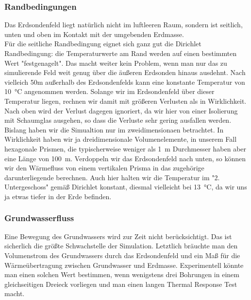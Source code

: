 \documentclass[12pt,a4paper]{article}
\begin{document}
\subsubsection{Randbedingungen}
Das Erdsondenfeld liegt natürlich nicht im luftleeren Raum, sondern ist seitlich, unten und oben im Kontakt mit der umgebenden Erdmasse.\\
Für die seitliche Randbedingung eignet sich ganz gut die Dirichlet Randbedingung: die Temperaturwerte am Rand werden auf einen bestimmten Wert "festgenagelt". Das macht weiter kein Problem, wenn man nur das zu simulierende Feld weit genug über die äußeren Erdsonden hinaus ausdehnt. Nach vielleich 50m außerhalb des Erdsondenfelds kann eine konstante Temperatur von 10~°C angenommen werden. Solange wir im Erdsondenfeld über dieser Temperatur liegen, rechnen wir damit mit größeren Verlusten als in Wirklichkeit.\\
Nach oben wird der Verlust dagegen ignoriert, da wir hier von einer Isolierung mit Schaumglas ausgehen, so dass die Verluste sehr gering ausfallen werden.\\
Bislang haben wir die Simualtion nur im zweidimensionaen betrachtet. In Wirklichkeit haben wir ja dreidimensionale Volumenelemente, in unserem Fall hexagonale Prismen, die typischerweise weniger als 1~m Durchmesser haben aber eine Länge von 100~m. Verdoppeln wir das Erdsondenfeld nach unten, so können wir den Wärmefluss von einem vertikalen Prisma in das zugehörige darunterliegende berechnen. Auch hier halten wir die Temperatur im "2. Untergeschoss" gemäß Dirichlet konstant, diesmal vielleicht bei 13~°C, da wir uns ja etwas tiefer in der Erde befinden.
\subsubsection{Grundwasserfluss}
Eine Bewegung des Grundwassers wird zur Zeit nicht berücksichtigt. Das ist sicherlich die größte Schwachstelle der Simulation. Letztlich bräuchte man den Volumenstrom des Grundwassers durch das Erdsondenfeld und ein Maß für die Wärmeübertragung zwischen Grundwasser und Erdmasse. Experimentell könnte man einen solchen Wert bestimmen, wenn wenigstens drei Bohrungen in einem gleichseitigen Dreieck vorliegen und man einen langen Thermal Response Test macht. 
\end{document}
